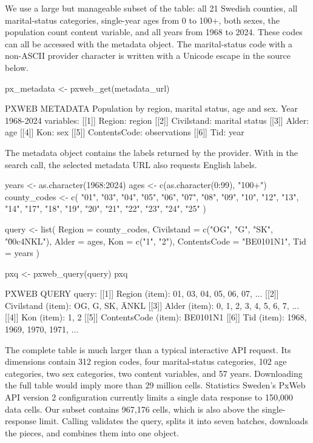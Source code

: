 \documentclass[11pt]{article}
\DeclareRobustCommand{\code}[1]{\texttt{\detokenize{#1}}}
\begin{document}
We use a large but manageable subset of the table: all 21 Swedish counties, all marital-status categories, single-year ages from 0 to 100+, both sexes, the population count content variable, and all years from 1968 to 2024.
These codes can all be accessed with the metadata object.
The marital-status code with a non-ASCII provider character is written with a Unicode escape in the source below.

\begin{Code}
px_metadata <- pxweb_get(metadata_url)
\end{Code}

\begin{CodeOutput}
PXWEB METADATA
Population by region, marital status, age and sex.  Year 1968-2024
variables:
 [[1]] Region: region
 [[2]] Civilstand: marital status
 [[3]] Alder: age
 [[4]] Kon: sex
 [[5]] ContentsCode: observations
 [[6]] Tid: year
\end{CodeOutput}

The metadata object contains the labels returned by the provider.
With \code{lang = "en"} in the search call, the selected metadata URL also requests English labels.

\begin{Code}
years <- as.character(1968:2024)
ages <- c(as.character(0:99), "100+")
county_codes <- c(
  "01", "03", "04", "05", "06", "07", "08", "09", "10", "12", "13",
  "14", "17", "18", "19", "20", "21", "22", "23", "24", "25"
)

query <- list(
  Region = county_codes,
  Civilstand = c("OG", "G", "SK", "\u00c4NKL"),
  Alder = ages,
  Kon = c("1", "2"),
  ContentsCode = "BE0101N1",
  Tid = years
)

pxq <- pxweb_query(query)
pxq
\end{Code}

\begin{CodeOutput}
PXWEB QUERY
query:
 [[1]] Region (item):
   01, 03, 04, 05, 06, 07, ...
 [[2]] Civilstand (item):
   OG, G, SK, ÄNKL
 [[3]] Alder (item):
   0, 1, 2, 3, 4, 5, 6, 7, ...
 [[4]] Kon (item):
   1, 2
 [[5]] ContentsCode (item):
   BE0101N1
 [[6]] Tid (item):
   1968, 1969, 1970, 1971, ...
\end{CodeOutput}

The complete table is much larger than a typical interactive API request.
Its dimensions contain 312 region codes, four marital-status categories, 102 age categories, two sex categories, two content variables, and 57 years.
Downloading the full table would imply more than 29 million cells.
Statistics Sweden's PxWeb API version 2 configuration currently limits a single data response to 150,000 data cells.
Our subset contains 967,176 cells, which is also above the single-response limit.
Calling \code{pxweb_get()} validates the query, splits it into seven batches, downloads the pieces, and combines them into one \code{pxweb_data_v2} object.
\end{document}
